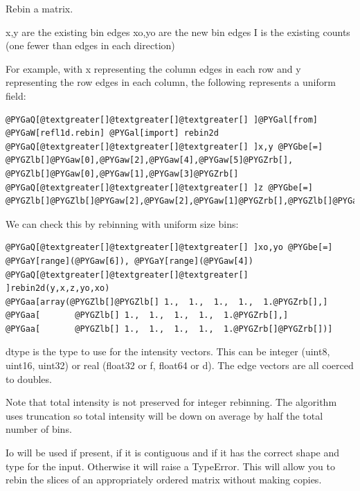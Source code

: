 \documentclass[letterpaper,10pt,english]{sphinxmanual}
\begin{document}
\begin{fulllineitems}
\label{api/rebin:refl1d.rebin.rebin2d}
Rebin a matrix.

x,y are the existing bin edges
xo,yo are the new bin edges
I is the existing counts (one fewer than edges in each direction)

For example, with x representing the column edges in each row and
y representing the row edges in each column, the following
represents a uniform field:

\begin{Verbatim}[commandchars=@\[\]]
@PYGaQ[@textgreater[]@textgreater[]@textgreater[] ]@PYGal[from] @PYGaW[refl1d.rebin] @PYGal[import] rebin2d
@PYGaQ[@textgreater[]@textgreater[]@textgreater[] ]x,y @PYGbe[=] @PYGZlb[]@PYGaw[0],@PYGaw[2],@PYGaw[4],@PYGaw[5]@PYGZrb[], @PYGZlb[]@PYGaw[0],@PYGaw[1],@PYGaw[3]@PYGZrb[]
@PYGaQ[@textgreater[]@textgreater[]@textgreater[] ]z @PYGbe[=] @PYGZlb[]@PYGZlb[]@PYGaw[2],@PYGaw[2],@PYGaw[1]@PYGZrb[],@PYGZlb[]@PYGaw[4],@PYGaw[4],@PYGaw[2]@PYGZrb[]@PYGZrb[]
\end{Verbatim}

We can check this by rebinning with uniform size bins:

\begin{Verbatim}[commandchars=@\[\]]
@PYGaQ[@textgreater[]@textgreater[]@textgreater[] ]xo,yo @PYGbe[=] @PYGaY[range](@PYGaw[6]), @PYGaY[range](@PYGaw[4])
@PYGaQ[@textgreater[]@textgreater[]@textgreater[] ]rebin2d(y,x,z,yo,xo)
@PYGaa[array(@PYGZlb[]@PYGZlb[] 1.,  1.,  1.,  1.,  1.@PYGZrb[],]
@PYGaa[       @PYGZlb[] 1.,  1.,  1.,  1.,  1.@PYGZrb[],]
@PYGaa[       @PYGZlb[] 1.,  1.,  1.,  1.,  1.@PYGZrb[]@PYGZrb[])]
\end{Verbatim}

dtype is the type to use for the intensity vectors.  This can be
integer (uint8, uint16, uint32) or real (float32 or f, float64 or d).
The edge vectors are all coerced to doubles.

Note that total intensity is not preserved for integer rebinning.
The algorithm uses truncation so total intensity will be down on
average by half the total number of bins.

Io will be used if present, if it is contiguous and if it has the
correct shape and type for the input.  Otherwise it will raise a
TypeError.  This will allow you to rebin the slices of an appropriately
ordered matrix without making copies.

\end{fulllineitems}
\end{document}
